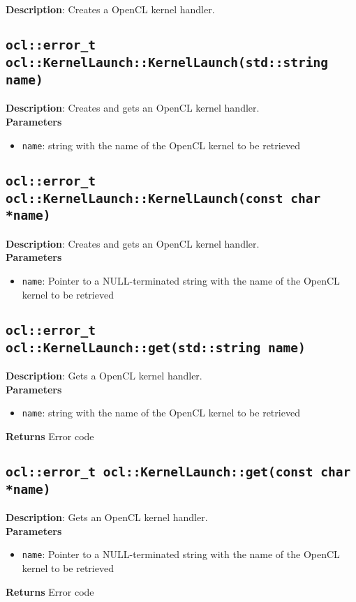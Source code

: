 \textbf{Description}: Creates a OpenCL kernel handler.

\subsection{\texttt{ocl::error\_t ocl::KernelLaunch::KernelLaunch(std::string name)}}

\textbf{Description}: Creates and gets an OpenCL kernel handler. \\
\textbf{Parameters}
\begin{itemize}
  \item \texttt{name}: string with the name of the OpenCL kernel to be retrieved
\end{itemize}

\subsection{\texttt{ocl::error\_t ocl::KernelLaunch::KernelLaunch(const char *name)}}

\textbf{Description}: Creates and gets an OpenCL kernel handler. \\
\textbf{Parameters}
\begin{itemize}
  \item \texttt{name}: Pointer to a NULL\hyp{}terminated string with the name of the OpenCL kernel 
to be retrieved
\end{itemize}

\subsection{\texttt{ocl::error\_t ocl::KernelLaunch::get(std::string name)}}

\textbf{Description}: Gets a OpenCL kernel handler. \\
\textbf{Parameters}
\begin{itemize}
  \item \texttt{name}: string with the name of the OpenCL kernel to be retrieved
\end{itemize}
\textbf{Returns} Error code

\subsection{\texttt{ocl::error\_t ocl::KernelLaunch::get(const char *name)}}

\textbf{Description}: Gets an OpenCL kernel handler. \\
\textbf{Parameters}
\begin{itemize}
  \item \texttt{name}: Pointer to a NULL\hyp{}terminated string with the name of the OpenCL kernel 
to be retrieved
\end{itemize}
\textbf{Returns} Error code

